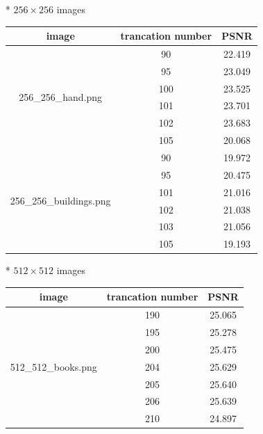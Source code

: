 \begin{enumerate}
\item[*] $256 \times 256$ images
\begin{table}[H]
    \centering
    \begin{tabular}{|c|c|c|}
        \hline
        \textbf{image} & \textbf{trancation number} & \textbf{PSNR} \\
        \hline
        \multirow{6}{*}{256_256_hand.png} & 90 & 22.419 \\
        \cline{2-3}
        & 95 & 23.049 \\
        \cline{2-3}
        & 100 & 23.525 \\
        \cline{2-3}
        & 101 & 23.701 \\
        \cline{2-3}
        & 102 & 23.683 \\
        \cline{2-3}
        & 105 & 20.068 \\ 
        \hline
        \multirow{6}{*}{256_256_buildings.png} & 90 & 19.972 \\
        \cline{2-3}
        & 95 & 20.475 \\
        \cline{2-3}
        & 101 & 21.016 \\
        \cline{2-3}
        & 102 & 21.038 \\
        \cline{2-3}
        & 103 & 21.056 \\
        \cline{2-3}
        & 105 & 19.193 \\ 
        \hline
    \end{tabular}
\end{table}
\item[*] $512 \times 512$ images
\begin{table}[H]
    \centering
    \begin{tabular}{|c|c|c|}
        \hline
        \textbf{image} & \textbf{trancation number} & \textbf{PSNR} \\
        \hline
        \multirow{7}{*}{512_512_books.png} & 190 & 25.065 \\
        \cline{2-3}
        & 195 & 25.278 \\
        \cline{2-3}
        & 200 & 25.475 \\
        \cline{2-3}
        & 204 & 25.629 \\
        \cline{2-3}
        & 205 & 25.640 \\
        \cline{2-3}
        & 206 & 25.639 \\
        \cline{2-3} 
        & 210 & 24.897 \\
        \hline

\end{tabular}
\end{table}
\end{enumerate}
